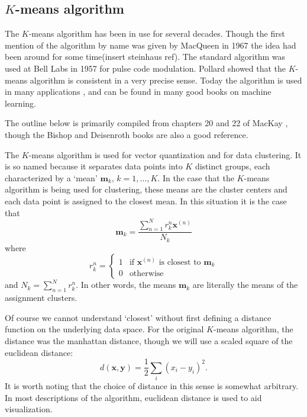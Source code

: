 
\subsection{$K$-means algorithm}\label{kmeans}
The $K$-means algorithm has been in use for several decades.  Though the first 
mention of the algorithm by name was given by MacQueen in 1967 \cite{
macqueen1967kmeans} the idea had been around for some time(insert steinhaus ref).  The standard  
algorithm was used at Bell Labs in 1957 \cite{Lloyd82} for pulse code 
modulation.  Pollard \cite{pollard1981,pollard1982} showed that the $K$-means 
algorithm is consistent in a very precise sense.  Today the algorithm is used 
in many applications \cite{AutoClass1,AutoClass2}, and can be found in many 
good books on machine learning.
\cite{Bishop1995,MacKay2002,BishopBook,hastie09esl,MML_2019}

The outline below is primarily compiled from chapters 20 and 22 of MacKay
\cite{MacKay2002}, though the Bishop and Deisenroth books 
\cite{BishopBook,MML_2019} are also a good reference.  

The \(K\)-means algorithm is used for vector quantization and for data 
clustering.  It is so named because it separates data points into $K$ distinct 
groups, each characterized by a `mean' \(\bm m_k,\, k= 1,\ldots,K\).  In the 
case that the \(K\)-means algorithm is being used for clustering, these means 
are the cluster centers and each data point is assigned to the closest mean.
In this situation it is the case that 
\[\bm m_k = \frac{\sum_{n=1}^{N} r_k^n \bm x^{(n)}}{N_k}\]
where 
\begin{equation*}
r^n_k = \begin{cases}
			1 & \text{if } \bm x^{(n)} \text{ is closest to } \bm m_k\\
			0 & \text{otherwise}
		\end{cases}
\end{equation*}
and \(N_k = \sum_{n=1}^{N} r^n_k\).  In other words, the means \(\bm m_k\) are 
literally the means of the assignment clusters.

Of course we cannot understand `closest' without first defining a distance 
function  on the underlying data space.  For the original \(K\)-means 
algorithm, the distance was the manhattan distance, though we will use a 
scaled square of the euclidean distance:
\[d(\bm x, \bm y) = \frac 12 \sum_i (x_i-y_i)^2.\]
It is worth noting that the choice of distance in this sense is somewhat 
arbitrary. In most descriptions of the algorithm, euclidean distance is used 
to aid visualization.

